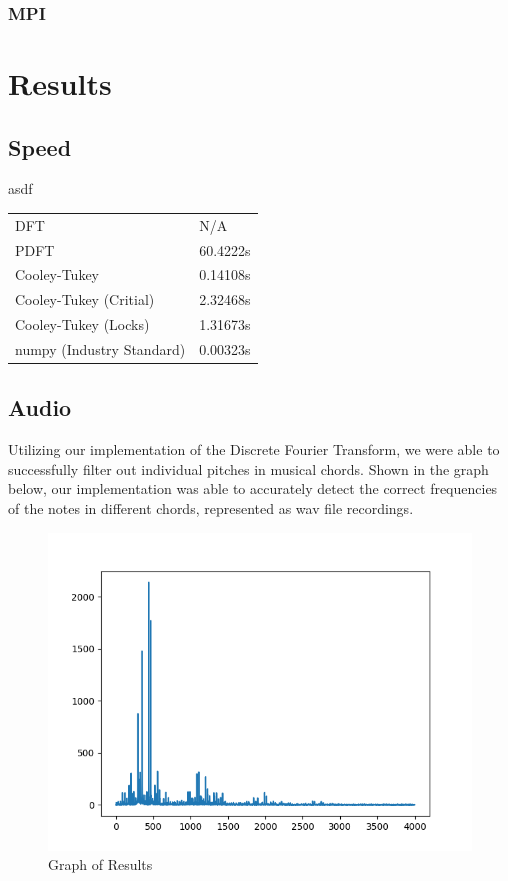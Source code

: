 \documentclass[12pt]{extarticle}
\begin{document}
	\subsubsection*{MPI}

\section*{Results}
\subsection*{Speed}
asdf
\begin{table}[h]
\begin{tabular}{ll}
DFT & N/A \\
PDFT & 60.4222s \\
Cooley-Tukey & 0.14108s \\
Cooley-Tukey (Critial) & 2.32468s \\
Cooley-Tukey (Locks) & 1.31673s \\
numpy (Industry Standard) & 0.00323s
\end{tabular}
\end{table}

\subsection*{Audio}
Utilizing our implementation of the Discrete Fourier Transform, we were able to successfully filter out individual pitches in musical
chords. Shown in the graph below, our implementation was able to accurately detect the correct frequencies of the notes in different chords, 
represented as wav file recordings.

\begin{figure}[h]
  \includegraphics[scale=0.75]{./images/pitchgraph.png}
  \caption{Graph of Results}
\end{figure}
\end{document}

